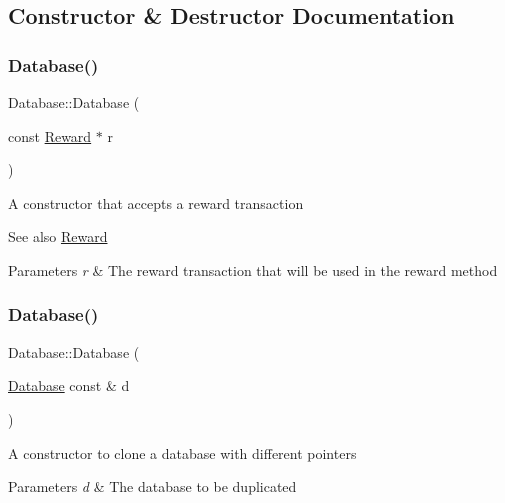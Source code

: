 \subsection{Constructor \& Destructor Documentation}
\mbox{\label{classDatabase_aa4e642803d3c4ce8f0bf741429b0938d}} 
\subsubsection{\texorpdfstring{Database()}{Database()}\hspace{0.1cm}{\footnotesize\ttfamily [1/2]}}
{\footnotesize\ttfamily Database\+::\+Database (\begin{DoxyParamCaption}\item[{const \mbox{\hyperlink{classReward}{Reward}} $\ast$}]{r }\end{DoxyParamCaption})\hspace{0.3cm}{\ttfamily [explicit]}}

A constructor that accepts a reward transaction \begin{DoxySeeAlso}{See also}
\mbox{\hyperlink{classReward}{Reward}}
\end{DoxySeeAlso}

\begin{DoxyParams}{Parameters}
{\em r} & The reward transaction that will be used in the reward method \\
\hline
\end{DoxyParams}
\mbox{\label{classDatabase_ab366035be8ad9836454da24f4a5e27ed}} 
\subsubsection{\texorpdfstring{Database()}{Database()}\hspace{0.1cm}{\footnotesize\ttfamily [2/2]}}
{\footnotesize\ttfamily Database\+::\+Database (\begin{DoxyParamCaption}\item[{\mbox{\hyperlink{classDatabase}{Database}} const \&}]{d }\end{DoxyParamCaption})}

A constructor to clone a database with different pointers


\begin{DoxyParams}{Parameters}
{\em d} & The database to be duplicated \\
\hline
\end{DoxyParams}


